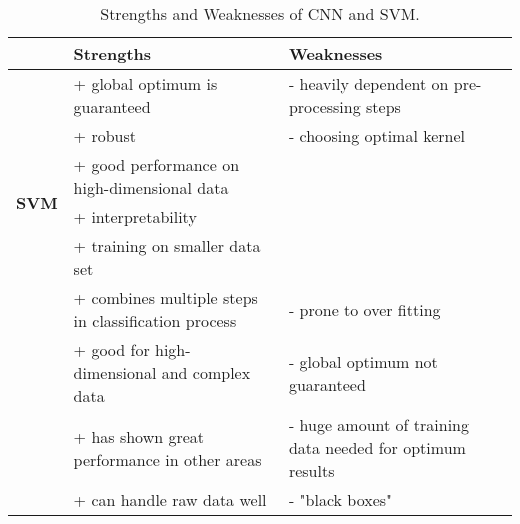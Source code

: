 \begin{table}[H]
\centering

  \caption{Strengths and Weaknesses of CNN and SVM.}
    \label{tab:pro}
  \def\arraystretch{1.5}
\begin{tabular}{p{1.5cm}|p{5cm}|p{5cm}}
\hline
 &     \textbf{Strengths} & \textbf{Weaknesses}   \\
\hline
\multirow[c]{6}{=}{\textbf{SVM}}         
    &  \footnotesize  + global optimum is guaranteed                                             & \footnotesize  - heavily dependent on pre-processing steps \\
    &  \footnotesize  + robust                                            & \footnotesize - choosing optimal kernel\\
        & \footnotesize + good performance on high-dimensional data &\\
    & \footnotesize + interpretability &\\
    & \footnotesize + training on smaller data set & \\
\hline
\multirow[c]{6}{=}{\textbf{CNN}}         & \footnotesize + combines multiple steps in classification process  &\footnotesize - prone to over fitting \\
    &\footnotesize + good for high-dimensional and complex data   &\footnotesize - global optimum not guaranteed\\
    & \footnotesize + has shown great performance in other areas & \footnotesize - huge amount of training data needed for optimum results \\
    & \footnotesize + can handle raw data well & \footnotesize - "black boxes" \\

\hline

\end{tabular}%
\end{table}



